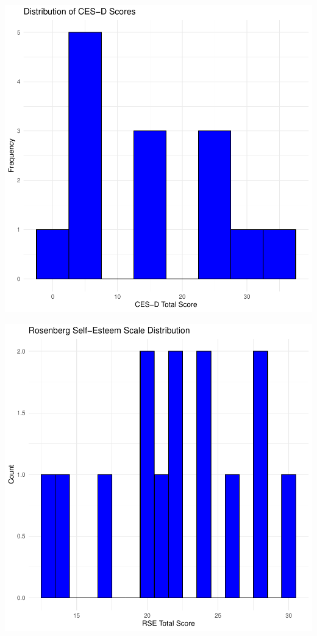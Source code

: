 \documentclass[
  man,
  longtable,
  nolmodern,
  notxfonts,
  notimes,
  colorlinks=true,linkcolor=blue,citecolor=blue,urlcolor=blue]{apa7}
\begin{document}
\includegraphics{SE-SCC-Depression_files/figure-pdf/CESD-score-distribution-1.pdf}

\includegraphics{SE-SCC-Depression_files/figure-pdf/RSES-score-distribution-1.pdf}
\end{document}
